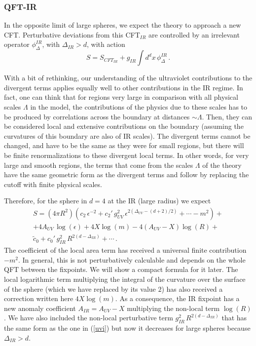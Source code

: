 \documentclass[11pt]{article}
\numberwithin{equation}{section}
\newcommand{\be}{\begin{equation}}
\newcommand{\ee}{\end{equation}}
\begin{document}
\subsubsection*{QFT-IR}
In the opposite limit of large spheres, we expect the theory to approach a new CFT. Perturbative deviations from this CFT$_{IR}$ are controlled by an irrelevant operator $\phi_\Delta^{IR}$, with $\Delta_{IR}> d$, with action
\be
S=S_{CFT_{IR}}+g_{IR} \int d^dx\, \phi^{IR}_\Delta\,. 
\ee

With a bit of rethinking, our understanding of the ultraviolet contributions to the divergent terms applies equally well to other contributions in the IR regime. In fact, one can think that for regions very large in comparison with all physical scales $\Lambda$ in the model,  the contributions of the physics due to these scales has to be produced by correlations across the boundary at distances $\sim\Lambda$. Then, they can be considered local and extensive contributions on the boundary (assuming the curvatures of this boundary are also of IR scales). The divergent terms cannot be changed, and have to be the same as they were for small regions, but there will be finite renormalizations to these divergent local terms. In other words, for very large and smooth regions, the terms that come from the scales $\Lambda$ of the theory have the same geometric form as the divergent terms and follow by replacing the cutoff with finite physical scales.  

Therefore, for the sphere in $d=4$ at the IR (large radius) we expect  
\begin{multline}
S=(4 \pi R^2)\left(c_2 \,\epsilon^{-2}+ c_{2}'\,g_{UV}^2 \,\epsilon^{2 \left(\Delta_{UV} -(d+2)/2\right)}+\cdots -m^2 \right) +
\\
+ 4 A_{UV} \, \log(\epsilon)+4 X \log(m) -4 (A_{UV}-X) \log(R) + \\
\tilde{c}_0 +c_0'\, g_{IR}^2 \, R^{2(d-\Delta_{IR})}+\cdots\,.
\end{multline}
The coefficient of the local area term has received a universal finite contribution $-m^2$. In general, this is not perturbatively calculable and depends on the whole QFT between the fixpoints. We will show a compact formula for it later. The local logarithmic term multiplying the integral of the curvature over the surface of the sphere (which we have replaced by its value $2$) has also received a correction written here $4 X \log(m)$. As a consequence, the IR fixpoint has a new anomaly coefficient $A_{IR}=A_{UV}-X$ multiplying the non-local term $\log(R)$. We have also included the non-local perturbative term $g_{IR}^2 \, R^{2(d-\Delta_{IR})}$ that has the same form as the one in (\ref{uvi}) but now it decreases for large spheres because $\Delta_{IR}>d$.     
\end{document}
